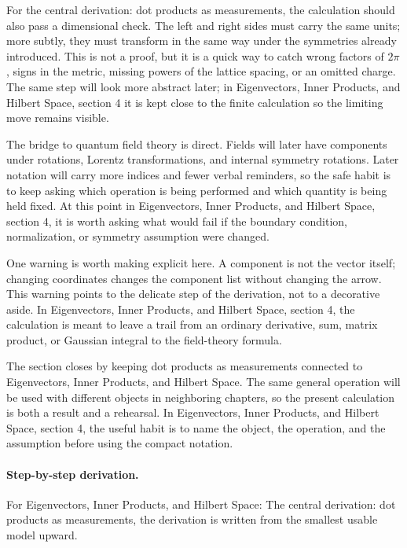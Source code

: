 For the central derivation: dot products as measurements, the calculation should also pass a dimensional check.  The left and right sides must carry the same units; more subtly, they must transform in the same way under the symmetries already introduced.  This is not a proof, but it is a quick way to catch wrong factors of \(2\pi\), signs in the metric, missing powers of the lattice spacing, or an omitted charge.  The same step will look more abstract later; in Eigenvectors, Inner Products, and Hilbert Space, section 4 it is kept close to the finite calculation so the limiting move remains visible.

The bridge to quantum field theory is direct.  Fields will later have components under rotations, Lorentz transformations, and internal symmetry rotations.  Later notation will carry more indices and fewer verbal reminders, so the safe habit is to keep asking which operation is being performed and which quantity is being held fixed.  At this point in Eigenvectors, Inner Products, and Hilbert Space, section 4, it is worth asking what would fail if the boundary condition, normalization, or symmetry assumption were changed.

One warning is worth making explicit here.  A component is not the vector itself; changing coordinates changes the component list without changing the arrow.  This warning points to the delicate step of the derivation, not to a decorative aside.  In Eigenvectors, Inner Products, and Hilbert Space, section 4, the calculation is meant to leave a trail from an ordinary derivative, sum, matrix product, or Gaussian integral to the field-theory formula.

The section closes by keeping dot products as measurements connected to Eigenvectors, Inner Products, and Hilbert Space.  The same general operation will be used with different objects in neighboring chapters, so the present calculation is both a result and a rehearsal.  In Eigenvectors, Inner Products, and Hilbert Space, section 4, the useful habit is to name the object, the operation, and the assumption before using the compact notation.



\paragraph{Step-by-step derivation.}

For Eigenvectors, Inner Products, and Hilbert Space: The central derivation: dot products as measurements, the derivation is written from the smallest usable model upward.

